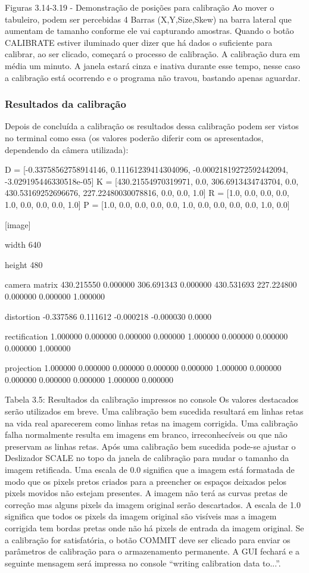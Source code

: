 Figuras 3.14-3.19 - Demonstração de posições para calibração
Ao mover o tabuleiro, podem ser percebidas 4 Barras (X,Y,Size,Skew) na barra lateral que aumentam de tamanho conforme ele vai capturando amostras. Quando o botão CALIBRATE estiver iluminado quer dizer que há dados o suficiente para calibrar, ao ser clicado, começará o processo de calibração.
A calibração dura em média um minuto. A janela estará cinza e inativa durante esse tempo, nesse caso a calibração está ocorrendo e o programa não travou, bastando apenas aguardar.

\subsubsection{Resultados da calibração}
Depois de concluída a calibração os resultados dessa calibração podem ser vistos no terminal como essa (os valores poderão diferir com os apresentados, dependendo da câmera utilizada):

D =  [-0.33758562758914146, 0.11161239414304096, -0.00021819272592442094, -3.029195446330518e-05]
K =  [430.21554970319971, 0.0, 306.6913434743704, 0.0, 430.53169252696676, 227.22480030078816, 0.0, 0.0, 1.0]
R =  [1.0, 0.0, 0.0, 0.0, 1.0, 0.0, 0.0, 0.0, 1.0]
P =  [1.0, 0.0, 0.0, 0.0, 0.0, 1.0, 0.0, 0.0, 0.0, 0.0, 1.0, 0.0]

[image]

width
640

height
480


camera matrix
430.215550 0.000000 306.691343
0.000000 430.531693 227.224800
0.000000 0.000000 1.000000

distortion
-0.337586 0.111612 -0.000218 -0.000030 0.0000

rectification
1.000000 0.000000 0.000000
0.000000 1.000000 0.000000
0.000000 0.000000 1.000000

projection
1.000000 0.000000 0.000000 0.000000
0.000000 1.000000 0.000000 0.000000
0.000000 0.000000 1.000000 0.000000


Tabela 3.5: Resultados da calibração impressos no console 
Os valores destacados serão utilizados em breve. Uma calibração bem sucedida resultará em linhas retas na vida real aparecerem como linhas retas na imagem corrigida. Uma calibração falha normalmente resulta em imagens em branco, irreconhecíveis ou que não preservam as linhas retas.
Após uma calibração bem sucedida pode-se ajustar o Deslizador SCALE no topo da janela de calibração para mudar o tamanho da imagem retificada. Uma escala de 0.0 significa que a imagem está formatada de modo que os pixels pretos criados para a preencher os espaços deixados pelos pixels movidos não estejam presentes. A imagem não terá as curvas pretas de correção mas alguns pixels da imagem original serão descartados. A escala de 1.0 significa que todos os pixels da imagem original são visíveis mas a imagem corrigida tem bordas pretas onde não há pixels de entrada da imagem original.
Se a calibração for satisfatória, o botão COMMIT deve ser clicado para enviar os parâmetros de calibração para o armazenamento permanente. A GUI fechará e a seguinte mensagem será impressa no console “writing calibration data to...”.

